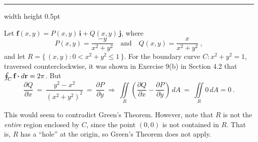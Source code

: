 \hrule width \textwidth height 0.5pt
\begin{exmp}\label{exmp:greenhole}
 Let $\mathbf{f}(x,y) = P(x,y)\,\mathbf{i} + Q(x,y)\,\mathbf{j}$, where
 \begin{displaymath}
  P(x,y) = \frac{-y}{x^2 + y^2} \quad\text{and}\quad Q(x,y) = \frac{x}{x^2 + y^2} ~,
 \end{displaymath}
 and let $R =\lbrace\,(x,y): 0 < x^2 + y^2 \le 1\,\rbrace$. For the boundary curve $C:x^2 + y^2 = 1$, traversed
 counterclockwise, it was shown in Exercise 9(b) in Section 4.2 that $\oint_{C} \textbf{f} \bm{\cdot} d\textbf{r} = 2\pi$. But
 \begin{displaymath}
  \frac{\partial Q}{\partial x} ~=~ \frac{y^2 - x^2}{(x^2 + y^2 )^2} ~=~ \frac{\partial P}{\partial y} ~
  \Rightarrow ~
  \iint\limits_{R} \left( \frac{\partial Q}{\partial x} - \frac{\partial P}{\partial y} \right)\,dA ~=~
  \iint\limits_{R} 0 \,dA = 0~.
 \end{displaymath}
\end{exmp}
This would seem to contradict Green's Theorem. However, note that $R$ is not the \emph{entire} region enclosed by $C$,
since the point $(0,0)$ is not contained in $R$. That is, $R$ has a ``hole'' at the origin, so Green's Theorem does not
apply.

